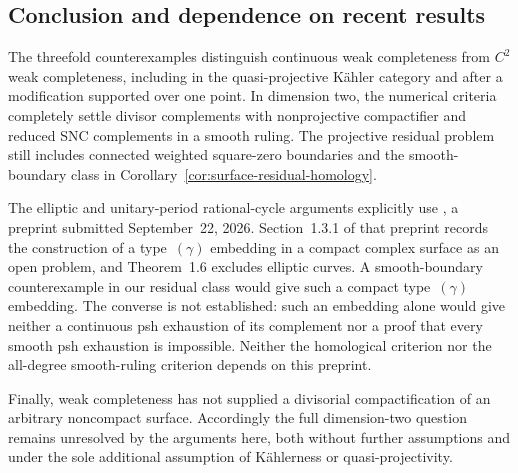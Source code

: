\documentclass[11pt]{amsart}
\theoremstyle{definition}
\theoremstyle{remark}
\numberwithin{equation}{section}
\begin{document}
\subsection{Conclusion and dependence on recent results}

The threefold counterexamples distinguish continuous weak completeness
from $C^2$ weak completeness, including in the quasi-projective
K\"ahler category and after a modification supported over one point.
In dimension two, the numerical criteria completely settle divisor
complements with nonprojective compactifier and reduced SNC complements
in a smooth ruling. The projective residual problem still includes
connected weighted square-zero boundaries and the smooth-boundary
class in Corollary~\ref{cor:surface-residual-homology}.

The elliptic and unitary-period rational-cycle arguments explicitly
use \cite{CFSTZ2026}, a preprint submitted September~22, 2026.
Section~1.3.1 of that preprint records the construction of a
type~$(\gamma)$ embedding in a compact complex surface as an open
problem, and Theorem~1.6 excludes elliptic curves. A smooth-boundary
counterexample in our residual class would give such a compact
type~$(\gamma)$ embedding. The converse is not established: such an
embedding alone would give neither a continuous psh exhaustion of its
complement nor a proof that every smooth psh exhaustion is impossible.
Neither the homological criterion nor the all-degree smooth-ruling
criterion depends on this preprint.

Finally, weak completeness has not supplied a divisorial
compactification of an arbitrary noncompact surface. Accordingly the
full dimension-two question remains unresolved by the arguments here,
both without further assumptions and under the sole additional
assumption of K\"ahlerness or quasi-projectivity.
\end{document}
